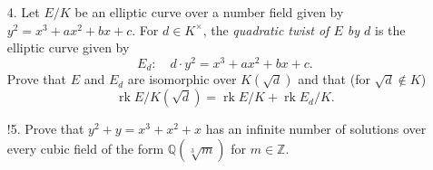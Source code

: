\documentclass[a4paper]{article}
\theoremstyle{plain}
\theoremstyle{remark}
\theoremstyle{definition}
\DeclareMathOperator{\Hom}{Hom}
\DeclareMathOperator{\Gal}{Gal}
\DeclareMathOperator{\rk}{rk}
\newcommand{\Z}{\mathbb{Z}}
\newcommand{\Q}{\mathbb{Q}}
\begin{document}
\begin{enumerate}
        Deduce that the rank of $E/K$ is at most $2n-2$, where
        $G\cong C_2\times\cdots\times C_2$ ($n$ times).

        \begin{proof}[Solution]
            For the Galois group, by Lemma 25 we have
            \begin{equation*}
                \Gal(K(Q_i)/K)\le C_2\times C_2,
            \end{equation*}
            so $K(Q_i)=K(\sqrt a,\sqrt b)$ for some $a,b\in K$. Therefore $F$ is
            given by adjoining at most $2k$ square roots to $K$, and hence $G$
            is isomorphic to a product of at most $2k$ copies of $C_2$. Now for
            the maps $f_{P_i}$ we have
            \begin{align*}
                f_{P_i}(\sigma\tau)
                    &= \sigma\tau(Q_i)\ominus Q_i \\
                    &= (\sigma(\tau(Q_i)-\tau(Q_i))) + (\tau(Q_i)-Q_i) \\
                    &= f_{\tau(P_i)}(\sigma) + f_{P_i}(\tau) \\
                    &= f_{P_i}(\sigma) + f_{P_i}(\tau)
            \end{align*}
            since $\sigma(P_i)=P_i$, and
            \begin{align*}
                f_{P_i\oplus P_j}(\sigma)
                    &= \sigma(Q_i\oplus Q_j)\ominus Q_i\ominus Q_j \\
                    &= \sigma(Q_i)\oplus\sigma(Q_j)\ominus Q_i\ominus Q_j \\
                    &= f_{P_i}(\sigma)\oplus f_{P_j}(\sigma),
            \end{align*}
            so this gives a homomorphism $E(K)/2E(K)\to\Hom(G,E(K)[2])$.
            Moreover, if $f_{P_i}=0$ then $\sigma(Q_i)=Q_i$ for all
            $\sigma\in G$, and hence $Q_i\in E(K)$, so $P_i\in 2E(K)$. Therefore
            it is injective.
        \end{proof}


    \item[4.] Let $E/K$ be an elliptic curve over a number field given by
        $y^2=x^3+ax^2+bx+c$. For $d\in K^\times$, the \emph{quadratic twist of
        $E$ by $d$} is the elliptic curve given by
        \begin{equation*}
            E_d:\quad d\cdot y^2=x^3+ax^2+bx+c.
        \end{equation*}
        Prove that $E$ and $E_d$ are isomorphic over $K(\sqrt d)$ and that (for
        $\sqrt d\notin K$)
        \begin{equation*}
            \rk E/K(\sqrt d) = \rk E/K + \rk E_d/K.
        \end{equation*}

    \item[!5.] Prove that $y^2+y=x^3+x^2+x$ has an infinite number of solutions
        over every cubic field of the form $\Q(\sqrt[3]{m})$ for $m\in\Z$.
\end{enumerate}
\end{document}
